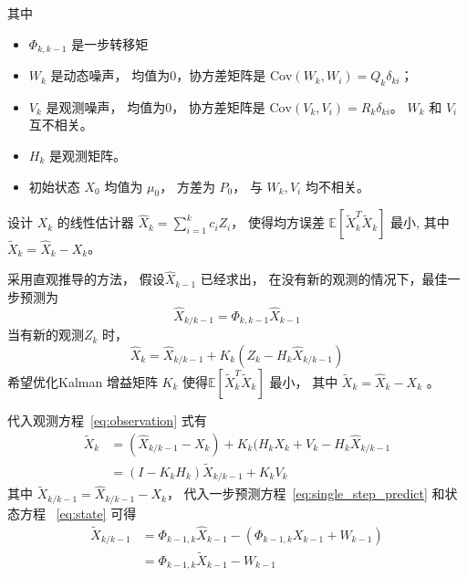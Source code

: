 \documentclass{ctexart}
\numberwithin{equation}{section}
\def\E{\mathbb{E}}
\def\Cov{\textrm{Cov}}
\begin{document}
其中
\begin{itemize}
\item $\Phi_{k, k-1}$ 是一步转移矩
\item $W_k$ 是动态噪声， 均值为0，协方差矩阵是 $ \Cov(W_k, W_i) = Q_k \delta_{ki} $；
\item $V_k $ 是观测噪声， 均值为0， 协方差矩阵是 $\Cov(V_k, V_i) = R_k \delta_{ki}$。
$W_k$ 和 $V_i$ 互不相关。
\item $H_k$ 是观测矩阵。
\item 初始状态 $X_0$ 均值为 $\mu_0$， 方差为 $P_0$， 与 $W_k, V_i$ 均不相关。
\end{itemize}
设计 $X_k$ 的线性估计器 $\hat{X}_k = \sum_{i=1}^k c_i Z_i$， 使得均方误差 $\E[\widetilde{X}_k^T \widetilde{X}_k]$ 最小, 其中 $\widetilde{X}_k = \hat{X}_k - X_k $。

采用直观推导的方法，
假设$\hat{X}_{k-1}$ 已经求出， 在没有新的观测的情况下，最佳一步预测为 
\begin{equation}\label{eq:single_step_predict}
\hat{X}_{k / k-1} =  \Phi_{k,k-1} \hat{X}_{k-1}
\end{equation}
当有新的观测$Z_k$ 时，
\begin{equation}\label{eq:state_estimate}
\hat{X}_k = \hat{X}_{k / k-1}  + K_k (Z_k - H_k \hat{X}_{k / k-1})
\end{equation}
希望优化Kalman 增益矩阵 $K_k$ 使得$\E[\widetilde{X}_k^T \widetilde{X}_k]$ 最小， 其中
$ \widetilde{X}_k = \hat{X}_k - X_k$ 。

代入观测方程~\eqref{eq:observation} 式有
\begin{align}
\widetilde{X}_k  & =  (\hat{X}_{k/k-1} - X_k) + K_k ( H_k X_k + V_k - H_k \hat{X}_{k/k-1} \nonumber\\
& = (I- K_k H_k)\widetilde{X}_{k/k-1} +K_k V_k \nonumber
\end{align}
其中 $\widetilde{X}_{k/k-1} = \hat{X}_{k/k-1} - X_k $， 代入一步预测方程~\eqref{eq:single_step_predict} 和状态方程 ~\eqref{eq:state} 可得
\begin{align*}
\widetilde{X}_{k/k-1}  & = \Phi_{k-1,k} \hat{X}_{k-1} - (\Phi_{k-1,k} X_{k-1} + W_{k-1} )\\
& = \Phi_{k-1, k} \widetilde{X}_{k-1} - W_{k-1}
\end{align*}
\end{document}
